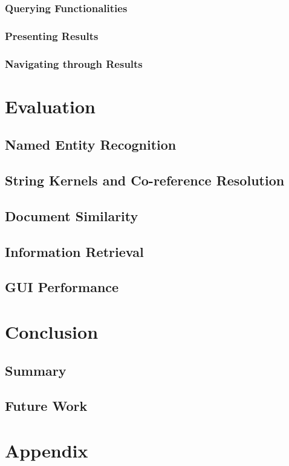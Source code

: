 \documentclass[11pt]{article}
\begin{document}
		\subsubsection {Querying Functionalities}
		\subsubsection {Presenting Results}
		\subsubsection {Navigating through Results}


\section{Evaluation} %
\label{sec:evaluation}

	\subsection {Named Entity Recognition}
	\subsection {String Kernels and Co-reference Resolution}
	\subsection {Document Similarity}
	\subsection {Information Retrieval}
	\subsection {GUI Performance}


\section{Conclusion} %
\label{sec:conclusion}


	\subsection {Summary}
	\subsection {Future Work}


\section{Appendix} %



\end{document}
